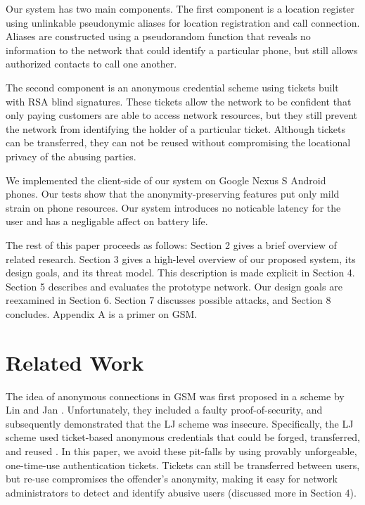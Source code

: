 \documentclass[11pt]{article}
\begin{document}
Our system has two main components. The first component is a location register using unlinkable pseudonymic aliases for location registration and call connection. Aliases are constructed using a pseudorandom function that reveals no information to the network that could identify a particular phone, but still allows authorized contacts to call one another.

The second component is an anonymous credential scheme using tickets built with RSA blind signatures. These tickets allow the network to be confident that only paying customers are able to access network resources, but they still prevent the network from identifying the holder of a particular ticket. Although tickets can be transferred, they can not be reused without compromising the locational privacy of the abusing parties.

We implemented the client-side of our system on Google Nexus S Android phones. Our tests show that the anonymity-preserving features put only mild strain on phone resources. Our system introduces no noticable latency for the user and has a negligable affect on battery life.

The rest of this paper proceeds as follows: Section 2 gives a brief overview of related research. Section 3 gives a high-level overview of our proposed system, its design goals, and its threat model. This description is made explicit in Section 4. Section 5 describes and evaluates the prototype network. Our design goals are reexamined in Section 6. Section 7 discusses possible attacks, and Section 8 concludes. Appendix A is a primer on GSM.

\section{Related Work}
The idea of anonymous connections in GSM was first proposed in a scheme by Lin and Jan \cite{lin2001wireless}. Unfortunately, they included a faulty proof-of-security, and \cite{barbancho2003cryptanalysis} subsequently demonstrated that the LJ scheme was insecure. Specifically, the LJ scheme used ticket-based anonymous credentials that could be forged, transferred, and reused \cite{yang2005secure, barbancho2003cryptanalysis}. In this paper, we avoid these pit-falls by using provably unforgeable, one-time-use authentication tickets. Tickets can still be transferred between users, but re-use compromises the offender's anonymity, making it easy for network administrators to detect and identify abusive users (discussed more in Section 4).
\end{document}
